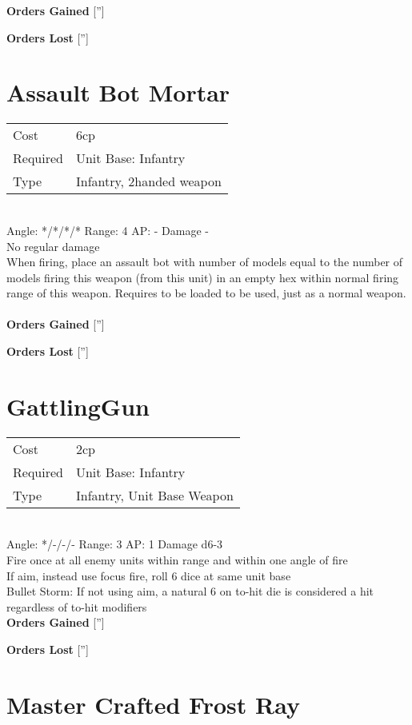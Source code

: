 {\bf Orders Gained}
['']

{\bf Orders Lost}
['']
\section{ Assault Bot Mortar }

\begin{tabular}{ll}
    Cost & 6cp \\
    Required & Unit Base: Infantry\\
    Type & Infantry, 2handed weapon\\
\end{tabular}
\ \\
\indent Angle: */*/*/* Range: 4  AP: - Damage - \\
No regular damage\\ When firing, place an assault bot with number of models equal to the number of models firing this weapon (from this unit) in an empty hex within normal firing range of this weapon. Requires to be loaded to be used, just as a normal weapon.
\ \\

{\bf Orders Gained}
['']

{\bf Orders Lost}
['']
\section{ GattlingGun }

\begin{tabular}{ll}
    Cost & 2cp \\
    Required & Unit Base: Infantry\\
    Type & Infantry, Unit Base Weapon\\
\end{tabular}
\ \\
\indent Angle: */-/-/- Range: 3  AP: 1 Damage d6-3 \\
Fire once at all enemy units within range and within one angle of fire \\ If aim, instead use focus fire, roll 6 dice at same unit base\\Bullet Storm: If not using aim, a natural 6 on to-hit die is considered a hit regardless of to-hit modifiers
\ \\

{\bf Orders Gained}
['']

{\bf Orders Lost}
['']
\section{ Master Crafted Frost Ray }

